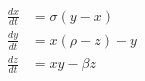\documentclass[preview]{standalone}
\begin{document}
\begin{align*}
\begin{aligned}
            \frac{dx}{dt} &= \sigma(y-x) \\
            \frac{dy}{dt} &= x(\rho-z)-y \\
            \frac{dz}{dt} &= xy-\beta z
            \end{aligned}
\end{align*}
\end{document}
